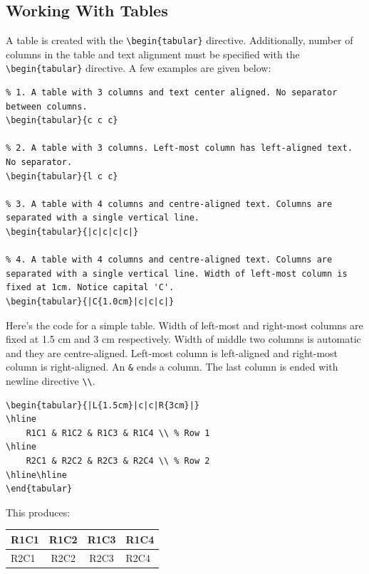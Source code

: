 \documentclass[12pt,a4paper]{article}
\begin{document}
\subsection{Working With Tables}
A table is created with the \verb|\begin{tabular}| directive. Additionally, number of columns in the table and text alignment must be specified with the \verb|\begin{tabular}| directive. A few examples are given below:
\lstset{language=TeX}
\begin{lstlisting}
% 1. A table with 3 columns and text center aligned. No separator between columns.
\begin{tabular}{c c c}

% 2. A table with 3 columns. Left-most column has left-aligned text. No separator.
\begin{tabular}{l c c}

% 3. A table with 4 columns and centre-aligned text. Columns are separated with a single vertical line.
\begin{tabular}{|c|c|c|c|}

% 4. A table with 4 columns and centre-aligned text. Columns are separated with a single vertical line. Width of left-most column is fixed at 1cm. Notice capital 'C'.
\begin{tabular}{|C{1.0cm}|c|c|c|}
\end{lstlisting}
Here's the code for a simple table. Width of left-most and right-most columns are fixed at 1.5 cm and 3 cm respectively. Width of middle two columns is automatic and they are centre-aligned. Left-most column is left-aligned and right-most column is right-aligned. An \verb|&| ends a column. The last column is ended with newline directive \verb|\\|.\newpage
\begin{lstlisting}
\begin{tabular}{|L{1.5cm}|c|c|R{3cm}|}
\hline
	R1C1 & R1C2 & R1C3 & R1C4 \\ % Row 1
\hline
	R2C1 & R2C2 & R2C3 & R2C4 \\ % Row 2
\hline\hline
\end{tabular}
\end{lstlisting}
This produces:
\begin{tabular}{|L{1.5cm}|c|c|R{3cm}|}
\hline
	R1C1 & R1C2 & R1C3 & R1C4 \\
\hline
	R2C1 & R2C2 & R2C3 & R2C4 \\
\hline\hline
\end{tabular}
\end{document}
